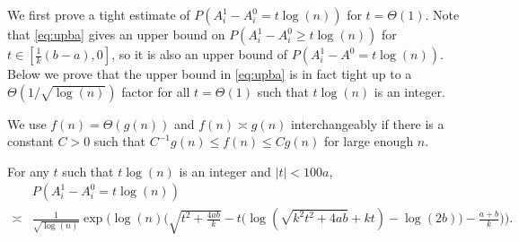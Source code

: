 \documentclass{article}
\begin{document}
We first prove a tight estimate of $P(A^1_i-A^0_i = t\log(n))$ for $t=\Theta(1)$. Note that \eqref{eq:upba} gives an upper bound on $P(A^1_i-A^0_i \ge t\log(n))$ for $t\in [\frac{1}{k}(b-a), 0]$, so it is also an upper bound of $P(A^1_i-A^0 = t\log(n))$. Below we prove that the upper bound in \eqref{eq:upba} is in fact tight up to a $\Theta(1/ \sqrt{\log(n)})$ factor for all $t=\Theta(1)$ such that $t\log(n)$ is an integer.

We use $f(n)=\Theta(g(n))$ and $f(n)\asymp g(n)$ interchangeably if there is a constant $C>0$ such that $C^{-1}g(n)\le f(n)\le C g(n)$ for large enough $n$.

\begin{proposition}  \label{prop:99}
For any $t$ such that $t\log(n)$ is an integer and $|t|<100a$,
\begin{equation} \label{eq:ly}
\begin{aligned}
& P(A^1_i-A^0_i = t\log(n))  \\
\asymp & \frac{1} {\sqrt{\log(n)}} \exp\Big(\log(n)
\Big(\sqrt{t^2+\frac{4ab}{k}} -t\big(\log(\sqrt{k^2t^2+4ab}+kt)-\log(2b) \big) -\frac{a+b}{k}  \Big)\Big) .
\end{aligned}
\end{equation}
\end{proposition}
\end{document}
